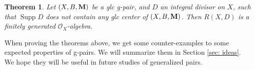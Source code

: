 \documentclass[11pt]{amsart}
\numberwithin{equation}{section}
\newcommand{\Mm}{{\bf{M}}}
\newcommand{\Supp}{\operatorname{Supp}}
\newcommand{\Oo}{\mathcal{O}}
\newtheorem{thm}{Theorem}[section]
\theoremstyle{definition}
\newtheorem{ques}[thm]{Question}
\theoremstyle{definition}
\theoremstyle{definition}
\begin{document}
\begin{thm}\label{thm: finite generation of R(X,A)}
  Let $(X,B,\Mm)$ be a glc g-pair, and $D$ an integral divisor on
  $X$, such that $\Supp D$ does not contain any glc center of
  $(X,B,\Mm)$. Then $R(X,D)$ is a finitely generated $\Oo_X$-algebra.
\end{thm}

When proving the theorems above, we get some counter-examples to some
expected properties of g-pairs. We will summarize them in Section
\ref{sec: ideas}. We hope they will be useful in future studies of
generalized pairs.

\begin{comment}
Finally, we recall the following question:

\begin{ques}\label{ques: bpf conjecture gpair}
Let $(X,B,\Mm)/U$ be a glc g-pair and $L$ a nef$/U$ Cartier divisor on $X$ such that $L-(K_X+B+\Mm_X)$ is ample$/U$. Do we have the following?
\begin{enumerate}
    \item $mL$ is base-point-free$/U$ for any integer $m\gg 0$.
    \item $L$ is semi-ample$/U$.
    \item If $L$ is a supporting function of a $(K_X+B+\Mm_X)$-negative extremal ray$/U$, then $mL$ is base-point-free$/U$ for any integer $m\gg 0$.
    \item If $L$ is a supporting function of a $(K_X+B+\Mm_X)$-negative extremal ray$/U$, then $L$ is semi-ample$/U$.
\end{enumerate}
Of course, (1) implies (2) and (3), and (2) or (3) implies (4).
\end{ques}
When $\Mm_X$ is $\mathbb R$-Cartier, Question \ref{ques: bpf conjecture gpair}(3) is true by \cite[Theorem 1.3]{HL21a} and  Question \ref{ques: bpf conjecture gpair}(2) is true by \cite[Theorem 1.2]{LX22}.  Indeed, in this case, Question \ref{ques: bpf conjecture gpair}(1) is also true as it is an easy consequence of \cite[Lemma 5.18]{HL21a} (see Theorem \ref{thm: bpf with mx r cartier}). However, we do not know Question \ref{ques: bpf conjecture gpair} in general when $\Mm_X$ is not $\mathbb R$-Cartier. As the existence of glc flips is completely solved by Theorem \ref{thm: glc flip exists}, a positive answer of Question \ref{ques: bpf conjecture gpair}, even only for Question \ref{ques: bpf conjecture gpair}(4), will allow us to run non-$\mathbb Q$-factorial minimal model programs for glc g-pairs.
\end{comment}
\end{document}
